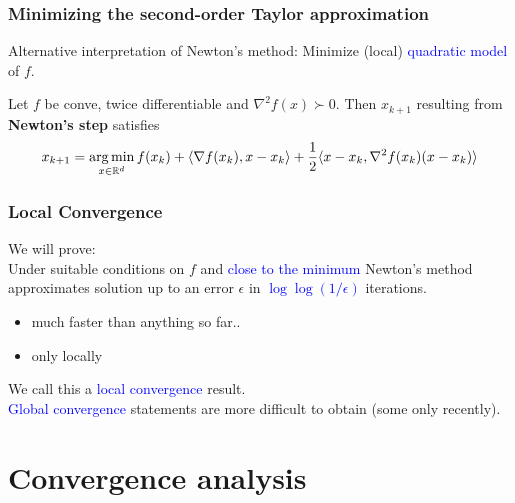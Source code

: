 \documentclass{beamer}
\begin{document}
\begin{frame}
  \frametitle{Minimizing the second-order Taylor approximation}
  Alternative interpretation of Newton's method:
  Minimize (local) \textcolor{blue}{quadratic model} of $f$.
  \begin{lemma}%
    Let $f$ be conve, twice differentiable and $\nabla^2 f(x) \succ 0$. Then $x_{k+1}$ resulting from \textbf{Newton's step} satisfies
    \begin{equation}
      x_{k+1} = \operatorname*{arg\,min}_{x \in \mathbb{R}^d} f(x_k) + \langle \nabla f(x_k), x-x_k \rangle + \frac12 \langle x-x_k, \nabla^2 f(x_k) (x-x_k)  \rangle
    \end{equation}
  \end{lemma}
\end{frame}


\begin{frame}
  \frametitle{Local Convergence}
  We will prove:\\
  Under suitable conditions on $f$ and \textcolor{blue}{close to the minimum} Newton's method approximates solution up to an error $\epsilon$ in \textcolor{blue}{$\log \log (1/\epsilon)$} iterations.
  \begin{itemize}
    \item much faster than anything so far..
    \item only locally
  \end{itemize}
  We call this a \textcolor{blue}{local convergence} result.\\

  \textcolor{blue}{Global convergence} statements are more difficult to obtain (some only recently).
\end{frame}

\section{Convergence analysis}%
\label{sec:}
\end{document}
